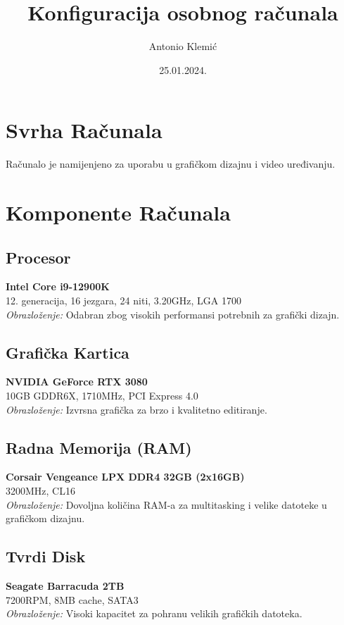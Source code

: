 \documentclass{article}
\title{Konfiguracija osobnog računala}
\author{Antonio Klemić}
\date{25.01.2024.}
\begin{document}
\maketitle

\section*{Svrha Računala}
Računalo je namijenjeno za uporabu u grafičkom dizajnu i video uređivanju.

\section*{Komponente Računala}

\subsection*{Procesor}
\textbf{Intel Core i9-12900K} \\
12. generacija, 16 jezgara, 24 niti, 3.20GHz, LGA 1700 \\
\textit{Obrazloženje:} Odabran zbog visokih performansi potrebnih za grafički dizajn.

\subsection*{Grafička Kartica}
\textbf{NVIDIA GeForce RTX 3080} \\
10GB GDDR6X, 1710MHz, PCI Express 4.0 \\
\textit{Obrazloženje:} Izvrsna grafička za brzo i kvalitetno editiranje.

\subsection*{Radna Memorija (RAM)}
\textbf{Corsair Vengeance LPX DDR4 32GB (2x16GB)} \\
3200MHz, CL16 \\
\textit{Obrazloženje:} Dovoljna količina RAM-a za multitasking i velike datoteke u grafičkom dizajnu.

\subsection*{Tvrdi Disk}
\textbf{Seagate Barracuda 2TB} \\
7200RPM, 8MB cache, SATA3 \\
\textit{Obrazloženje:} Visoki kapacitet za pohranu velikih grafičkih datoteka.
\end{document}

